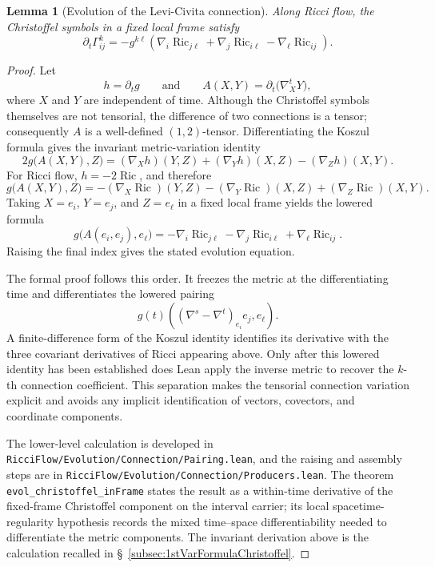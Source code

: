 \documentclass[11pt]{article}
\theoremstyle{plain}
\newtheorem{lemma}[theorem]{Lemma}
\theoremstyle{definition}
\theoremstyle{remark}
\newcommand{\Ric}{\operatorname{Ric}}
\newcommand{\leanref}[1]{\nolinkurl{#1}}
\newcommand{\leanfile}[1]{\nolinkurl{#1}}
\newcommand{\rffile}[1]{\leanfile{#1}}
\begin{document}
\begin{lemma}[Evolution of the Levi-Civita connection]
\label{lem:evol-christoffel}
Along Ricci flow, the Christoffel symbols in a fixed local frame satisfy
\[
  \partial_t\Gamma^k_{ij}
  =
  -g^{k\ell}
  \left(
    \nabla_i\Ric_{j\ell}
    +
    \nabla_j\Ric_{i\ell}
    -
    \nabla_\ell\Ric_{ij}
  \right).
\]
\end{lemma}

\begin{proof}
Let
\[
  h=\partial_tg
  \qquad\text{and}\qquad
  A(X,Y)=\partial_t\bigl(\nabla^t_XY\bigr),
\]
where \(X\) and \(Y\) are independent of time.  Although the Christoffel symbols
themselves are not tensorial, the difference of two connections is a tensor;
consequently \(A\) is a well-defined \((1,2)\)-tensor.  Differentiating the
Koszul formula gives the invariant metric-variation identity
\[
  2g\bigl(A(X,Y),Z\bigr)
  =
  (\nabla_Xh)(Y,Z)
  +
  (\nabla_Yh)(X,Z)
  -
  (\nabla_Zh)(X,Y).
\]
For Ricci flow, \(h=-2\Ric\), and therefore
\[
  g\bigl(A(X,Y),Z\bigr)
  =
  -(\nabla_X\Ric)(Y,Z)
  -(\nabla_Y\Ric)(X,Z)
  +(\nabla_Z\Ric)(X,Y).
\]
Taking \(X=e_i\), \(Y=e_j\), and \(Z=e_\ell\) in a fixed local frame yields the
lowered formula
\[
  g\bigl(A(e_i,e_j),e_\ell\bigr)
  =
  -\nabla_i\Ric_{j\ell}
  -\nabla_j\Ric_{i\ell}
  +\nabla_\ell\Ric_{ij}.
\]
Raising the final index gives the stated evolution equation.

The formal proof follows this order.  It freezes the metric at the
differentiating time and differentiates the lowered pairing
\[
  g(t)\!\left(
    (\nabla^s-\nabla^t)_{e_i}e_j,e_\ell
  \right).
\]
A finite-difference form of the Koszul identity identifies its derivative with
the three covariant derivatives of Ricci appearing above.  Only after this
lowered identity has been established does Lean apply the inverse metric to
recover the \(k\)-th connection coefficient.  This separation makes the
tensorial connection variation explicit and avoids any implicit identification
of vectors, covectors, and coordinate components.

The lower-level calculation is developed in
\rffile{RicciFlow/Evolution/Connection/Pairing.lean}, and the raising and
assembly steps are in \rffile{RicciFlow/Evolution/Connection/Producers.lean}.
The theorem \leanref{evol_christoffel_inFrame} states the result as a
within-time derivative of the fixed-frame Christoffel component on the interval
carrier; its local spacetime-regularity hypothesis records the mixed
time--space differentiability needed to differentiate the metric components.
The invariant derivation above is the calculation recalled in
\S~\ref{subsec:1stVarFormulaChristoffel}.
\end{proof}
\end{document}
